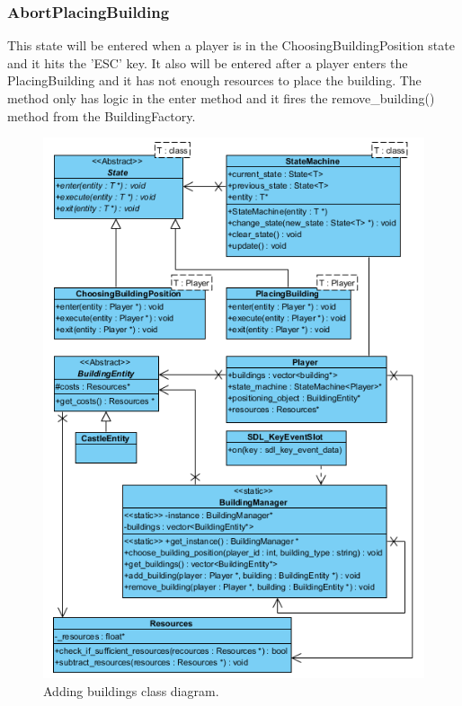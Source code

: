 \subsubsection{AbortPlacingBuilding}
This state will be entered when a player is in the ChoosingBuildingPosition state and it hits the 'ESC' key. It also will be entered after a player enters the PlacingBuilding and it has not enough resources to place the building. The method only has logic in the enter method and it fires the remove\_building() method from the BuildingFactory. 

\begin{figure}[!htb]
    \centering
    \includegraphics{res/adding-buildings/States-ClassDiagram.png}
    \caption{Adding buildings class diagram.}\label{fig:classdiagram-addingbuildings}
\end{figure}
\clearpage



